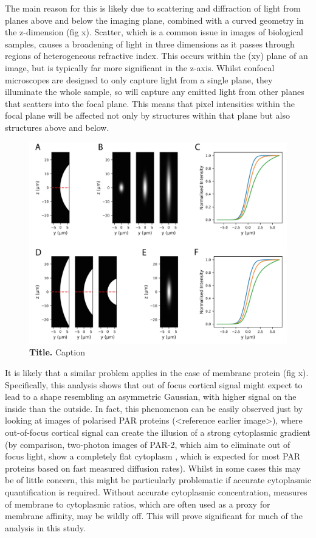 \documentclass[12pt]{"article"}
\newcommand{\mycaption}[2]{\caption[#1]{\textbf{#1.} #2}}
\begin{document}
The main reason for this is likely due to scattering and diffraction of light from planes above and below the imaging plane, combined with a curved geometry in the z-dimension (fig x). Scatter, which is a common issue in images of biological samples, causes a broadening of light in three dimensions as it passes through regions of heterogeneous refractive index. This occurs within the (xy) plane of an image, but is typically far more significant in the z-axis. Whilst confocal microscopes are designed to only capture light from a single plane, they illuminate the whole sample, so will capture any emitted light from other planes that scatters into the focal plane. This means that pixel intensities within the focal plane will be affected not only by structures within that plane but also structures above and below.\\


\begin{figure}[!h]
\includegraphics[scale=0.9]{memquant_cyt_psf}
\setlength{\abovecaptionskip}{20pt}
\centering
\mycaption{Title}{Caption}
\label{fig:memquant_cyt_psf}
\end{figure}

It is likely that a similar problem applies in the case of membrane protein (fig x). Specifically, this analysis shows that out of focus cortical signal might expect to lead to a shape resembling an asymmetric Gaussian, with higher signal on the inside than the outside. In fact, this phenomenon can be easily observed just by looking at images of polarised PAR proteins (<reference earlier image>), where out-of-focus cortical signal can create the illusion of a strong cytoplasmic gradient (by comparison, two-photon images of PAR-2, which aim to eliminate out of focus light, show a completely flat cytoplasm \citep{Petrasek2008}, which is expected for most PAR proteins based on fast measured diffusion rates). Whilst in some cases this may be of little concern, this might be particularly problematic if accurate cytoplasmic quantification is required. Without accurate cytoplasmic concentration, measures of membrane to cytoplasmic ratios, which are often used as a proxy for membrane affinity, may be wildly off. This will prove significant for much of the analysis in this study.\\
\end{document}
